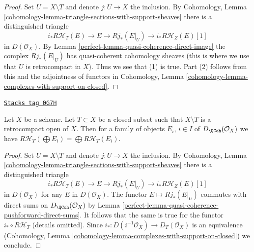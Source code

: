 \begin{proof}

Set $U = X \setminus T$ and denote $j : U \to X$ the inclusion. By
Cohomology, Lemma \ref{cohomology-lemma-triangle-sections-with-support-sheaves}
there is a distinguished triangle
$$
i_*R\mathcal{H}_T(E) \to E \to Rj_*(E|_U) \to i_*R\mathcal{H}_Z(E)[1]
$$
in $D(\mathcal{O}_X)$. By Lemma \ref{perfect-lemma-quasi-coherence-direct-image}
the complex $Rj_*(E|_U)$ has quasi-coherent cohomology sheaves
(this is where we use that $U$ is retrocompact in $X$).
Thus we see that (1) is true. Part (2) follows from this and
the adjointness of functors in
Cohomology, Lemma \ref{cohomology-lemma-complexes-with-support-on-closed}.
\end{proof}

\begin{lemma}
\label{perfect-lemma-support-direct-sums}
\href{https://stacks.math.columbia.edu/tag/0G7H}{\texttt{Stacks tag 0G7H}}

Let $X$ be a scheme. Let $T \subset X$ be a closed subset such that
$X \setminus T$ is a retrocompact open of $X$. Then for a family of
objects $E_i$, $i \in I$ of $D_\QCoh(\mathcal{O}_X)$ we have
$R\mathcal{H}_T(\bigoplus E_i) = \bigoplus R\mathcal{H}_T(E_i)$.
\end{lemma}

\begin{proof}

Set $U = X \setminus T$ and denote $j : U \to X$ the inclusion. By
Cohomology, Lemma \ref{cohomology-lemma-triangle-sections-with-support-sheaves}
there is a distinguished triangle
$$
i_*R\mathcal{H}_T(E) \to E \to Rj_*(E|_U) \to i_*R\mathcal{H}_Z(E)[1]
$$
in $D(\mathcal{O}_X)$ for any $E$ in $D(\mathcal{O}_X)$. The functor
$E \mapsto Rj_*(E|_U)$ commutes with direct sums on $D_\QCoh(\mathcal{O}_X)$
by Lemma \ref{perfect-lemma-quasi-coherence-pushforward-direct-sums}.
It follows that the same is true for the functor $i_* \circ R\mathcal{H}_T$
(details omitted). Since $i_* : D(i^{-1}\mathcal{O}_X) \to D_T(\mathcal{O}_X)$
is an equivalence
(Cohomology, Lemma \ref{cohomology-lemma-complexes-with-support-on-closed})
we conclude.
\end{proof}

